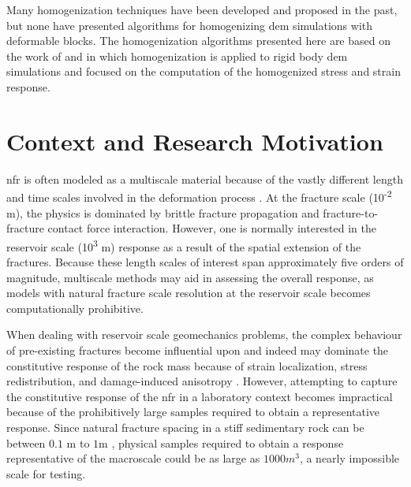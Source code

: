 Many homogenization techniques have been developed and proposed in the past, but none have presented algorithms for homogenizing \acrfull{dem} simulations with deformable blocks. The homogenization algorithms presented here are based on the work of \citet{daddetta_particle_2004} and \citet{wellmann_homogenization_2008} in which homogenization is applied to rigid body \acrshort{dem} simulations and focused on the computation of the homogenized stress and strain response. 

\section{Context and Research Motivation}

\acrfull{nfr} is often modeled as a multiscale material because of the vastly different length and time scales involved in the deformation process \citep{zhou_flow_2003}. At the fracture scale (10\textsuperscript{-2} m), the physics is dominated by brittle fracture propagation and fracture-to-fracture contact force interaction. However, one is normally interested in the reservoir scale (10\textsuperscript{3} m) response as a result of the spatial extension of the fractures. Because these length scales of interest span approximately five orders of magnitude, multiscale methods may aid in assessing the overall response, as models with natural fracture scale resolution at the reservoir scale becomes computationally prohibitive.

When dealing with reservoir scale geomechanics problems, the complex behaviour of pre-existing fractures become influential upon and indeed may dominate the constitutive response of the rock mass because of strain localization, stress redistribution, and damage-induced anisotropy \citep{Petracca_2015}. However, attempting to capture the constitutive response of the \acrshort{nfr} in a laboratory context becomes impractical because of the prohibitively large samples required to obtain a representative response. Since natural fracture spacing in a stiff sedimentary rock can be between $0.1$ m to $1$m \citep{Nelson_2001}, physical samples required to obtain a response representative of the macroscale could be as large as $1000 m^3$, a nearly impossible scale for testing. 

